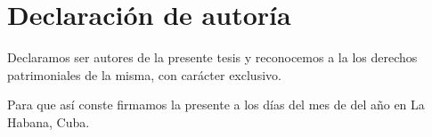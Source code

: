 \chapter*{Declaración de autoría}

Declaramos ser autores de la presente tesis y reconocemos a la \uci los derechos patrimoniales de la misma, con carácter exclusivo.

\par
Para que así conste firmamos la presente a los \dayfield días del mes de \monthfield del año \yearfield en La Habana, Cuba.

\begin{center}
	\signaturefield{\autorA}
	\signaturefield{\autorB}
	\signaturefield[Tutor]{\tutorA}
\end{center}
